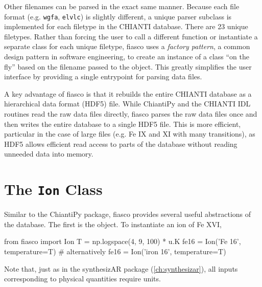 Other filenames can be parsed in the exact same manner. Because each file format (e.g. \texttt{wgfa}, \texttt{elvlc}) is slightly different, a unique parser subclass is implemented for each filetype in the CHIANTI database. There are 23 unique filetypes. Rather than forcing the user to call a different function or instantiate a separate class for each unique filetype, fiasco uses a \textit{factory pattern}, a common design pattern in software engineering, to create an instance of a class ``on the fly'' based on the filename passed to the  object. This greatly simplifies the user interface by providing a single entrypoint for parsing data files.

A key advantage of fiasco is that it rebuilds the entire CHIANTI database as a hierarchical data format (HDF5) file. While ChiantiPy and the CHIANTI IDL routines read the raw data files directly, fiasco parses the raw data files once and then writes the entire database to a single HDF5 file. This is more efficient, particular in the case of large files (e.g. Fe IX and XI with many transitions), as HDF5 allows efficient read access to parts of the database without reading unneeded data into memory. 

\section{The \texttt{Ion} Class}\label{sec:fiasco-ion}

Similar to the ChiantiPy package, fiasco provides several useful abstractions of the database. The first is the  object. To instantiate an ion of Fe XVI,
\begin{pyblock}[appendix1][baselinestretch=1,xleftmargin=3em]
from fiasco import Ion
T = np.logspace(4, 9, 100) * u.K
fe16 = Ion('Fe 16', temperature=T)
# alternatively
fe16 = Ion('iron 16', temperature=T)
\end{pyblock}
Note that, just as in the synthesizAR package (\autoref{ch:synthesizar}), all inputs corresponding to physical quantities require units.

